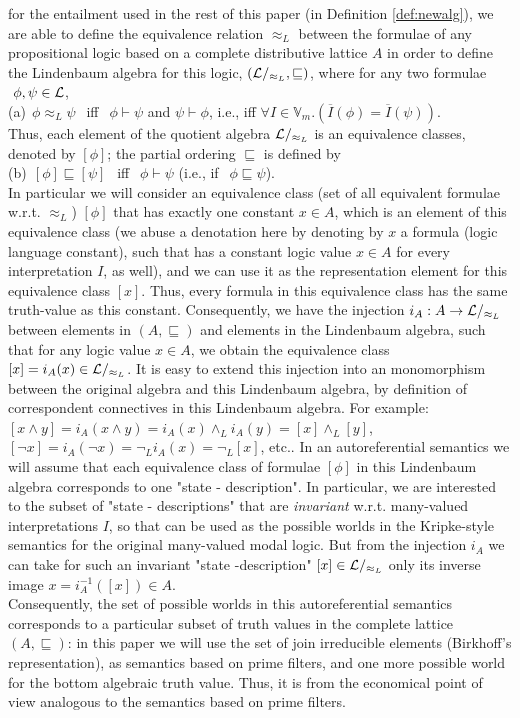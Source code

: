 \documentclass[10pt,twocolumn]{article}
\begin{document}
for the entailment used in the rest of this paper (in Definition
\ref{def:newalg}), we are able to
 define the equivalence relation $\approx_L$ between the formulae of any
 propositional logic based on a  complete distributive lattice  $A$ in order to
 define the Lindenbaum algebra for this logic, $(\mathcal{L}/_{\approx_L}, \sqsubseteq) $,
 where for any two formulae $~\phi, \psi \in \mathcal{L}$,\\ (a)$~~\phi \approx_L
 \psi~~$ iff $~~\phi \vdash \psi$ and $\psi \vdash \phi$, i.e., iff
  $\forall I \in
 \mathbb{V}_m.(\overline{I}(\phi) = \overline{I}(\psi))$. \\
Thus, each element of the quotient algebra $\mathcal{L}/_{\approx_L}$ is an
 equivalence classes, denoted by $[\phi]$; the partial ordering
 $\sqsubseteq$ is defined by\\ (b)$~~[\phi]\sqsubseteq[\psi]~~$ iff $~~\phi
 \vdash \psi$ (i.e., if $~~\phi \sqsubseteq \psi$).\\
  In particular we will consider an  equivalence class (set
 of all equivalent formulae w.r.t. $\approx_L$) $[\phi]$ that has exactly one
 constant $x \in A$, which is an element of this equivalence class (we abuse a denotation here by denoting by $x$ a formula (logic language constant),
  such that has a constant logic value $x \in A$ for
 every interpretation $I$,  as well), and we
 can use it as the representation element for this equivalence
 class $[x]$. Thus, every formula in this equivalence class has the same
 truth-value as this constant.
 Consequently, we have the injection $i_A:A \rightarrow \mathcal{L}/_{\approx_L}$ between elements in  $(A, \sqsubseteq)$
 and elements in the Lindenbaum algebra, such that for
 any logic value  $x \in A$,  we obtain the equivalence class $[x] = i_A(x)  \in \mathcal{L}/_{\approx_L}$.
 It is easy to extend this injection into an monomorphism between the
 original algebra and this Lindenbaum algebra, by definition of
 correspondent connectives in this Lindenbaum algebra. For example:
 $[x \wedge y] = i_A(x \wedge y) = i_A(x) \wedge_L i_A(y) = [x]
 \wedge_L [y]$, $[\neg x] = i_A(\neg x) = \neg_L i_A(x) = \neg_L[x]$,
 etc..
In an autoreferential semantics we will assume that each equivalence
class of formulae $[\phi]$ in this Lindenbaum algebra corresponds to
one "state - description". In particular, we are interested to the
subset of "state - descriptions" that are \emph{invariant} w.r.t.
many-valued interpretations $I$, so that can be used as the possible
worlds in the Kripke-style semantics for the original many-valued
modal logic. But from the injection $i_A$ we can take for such an
invariant
"state -description" $[x]\in \mathcal{L}/_{\approx_L}$ only its inverse image  $x = i_A^{-1}([x]) \in A$.\\
Consequently, the set of possible worlds in this autoreferential
semantics corresponds to a particular subset of truth values in the
complete lattice $(A, \sqsubseteq)$:
 in this paper we will use the set of join irreducible elements (Birkhoff's representation),
 as semantics based on prime filters, and one more possible world for
the bottom algebraic truth value. Thus, it is from the economical
point of view analogous to the semantics based on prime filters.
\end{document}
